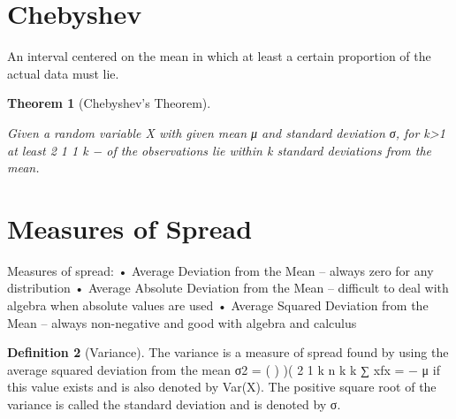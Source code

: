 \documentclass[10pt,]{book}
\theoremstyle{plain}
\newtheorem{theorem}{Theorem}[section]
\theoremstyle{definition}
\newtheorem{definition}[theorem]{Definition}
\theoremstyle{definition}
\numberwithin{equation}{section}
\begin{document}
\section[Chebyshev]{Chebyshev}\label{section-37}
An interval centered on the mean in which at least a certain proportion
	of the actual data must lie.
\begin{theorem}[Chebyshev's Theorem]\label{theorem-31}

	Given a random variable X with given mean μ and standard deviation σ, for k>1 at least
	2
	1 1
	k − of the observations lie within k standard deviations from the mean.
	\end{theorem}
\typeout{************************************************}
\typeout{************************************************}
\section[Measures of Spread]{Measures of Spread}\label{section-38}
Measures of spread:
• Average Deviation from the Mean – always zero for any distribution
• Average Absolute Deviation from the Mean – difficult to deal with algebra when absolute values are used
• Average Squared Deviation from the Mean – always non-negative and good with algebra and calculus 
%
\begin{definition}[Variance]\label{definition-32}
The variance is a measure of spread found by using the average squared deviation from the mean
σ2
 = ( ) )(
2
1
k
n
k
k ∑ xfx =
− μ
if this value exists and is also denoted by Var(X). The positive square root of the variance is called the standard deviation
and is denoted by σ. \end{definition}
\end{document}
